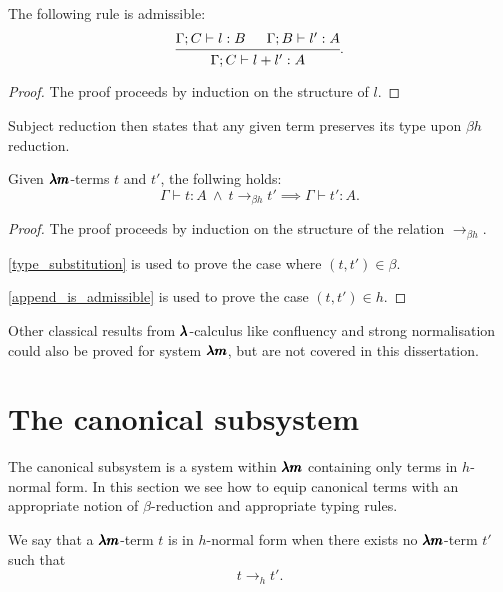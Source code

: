 \begin{lemma}
  \label{append_is_admissible}
  The following rule is admissible:
  \[
    \begin{prooftree}
      \hypo{ \Gamma ; C \vdash l:B }
      \hypo{ \Gamma ; B \vdash l':A }
      \infer2{ \Gamma ; C \vdash  l+l' : A }
    \end{prooftree}.
  \]
\end{lemma}
\begin{proof}
  The proof proceeds by induction on the structure of $l$.
\end{proof}


Subject reduction then states that any given term preserves its type upon $\beta h$ reduction.

\begin{theorem}
  \label{type_preservation}
  Given $\pmb{\lambda m}$-terms $t$ and $t'$, the follwing holds:
  \[
    \Gamma \vdash t : A \ \land \ t \to_{\beta h} t' \implies \Gamma \vdash t' : A.
  \]
\end{theorem}
\begin{proof}
  The proof proceeds by induction on the structure of the relation $\to_{\beta h}$.

  \cref{type_substitution} is used to prove the case where $(t, t') \in \beta$.

  \cref{append_is_admissible} is used to prove the case $(t, t') \in h$.
\end{proof}

Other classical results from $\pmb{\lambda}$-calculus like confluency and strong normalisation could also be proved for system $\pmb{\lambda m}$, but are not covered in this dissertation.


\section{The canonical subsystem}

The canonical subsystem is a system within $\pmb{\lambda m}$ containing only terms in $h$-normal form.
In this section we see how to equip canonical terms with an appropriate notion of $\beta$-reduction and appropriate typing rules.

\begin{definition}
  We say that a $\pmb{\lambda m}$-term $t$ is in $h$-normal form when there exists no $\pmb{\lambda m}$-term $t'$ such that \[ t \to_h t' . \]
\end{definition}

